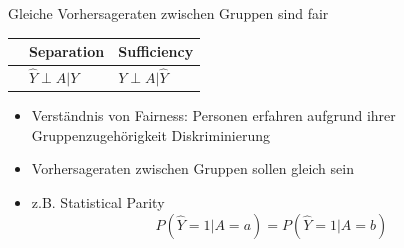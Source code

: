 \documentclass[aspectratio=169]{beamer}
\begin{document}
\begin{frame}[t]{Gleiche Vorhersageraten zwischen Gruppen sind fair} %
	\begin{table}
        \begin{tabular}{lll}
            \toprule
            \color{orange}{Independence} & Separation & Sufficiency \\
            \midrule
            \color{orange}{$\hat{Y} \perp A$} & $\hat{Y} \perp A | Y$ & $Y \perp A | \hat{Y}$\\
            \bottomrule
        \end{tabular}
    \end{table}
	\begin{itemize}
		\item<2-> Verständnis von Fairness: Personen erfahren aufgrund ihrer Gruppenzugehörigkeit Diskriminierung
		\item<3-> Vorhersageraten zwischen Gruppen sollen gleich sein
		\item<4-> z.B. Statistical Parity 	$$P(\hat{Y} = 1 | A = a) = P(\hat{Y} = 1 | A = b)$$ %
	\end{itemize}
\end{frame}
\end{document}
